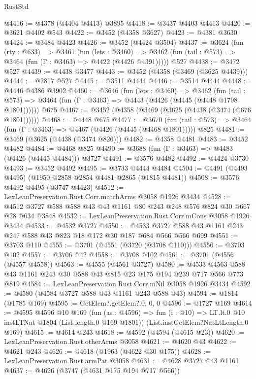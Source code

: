 \begin{lexlean}{RustStd}
\begin{coremodule}
@4416 := @4378 (@4404 @4413) @3895
@4418 := @3437 @4403 @4413
@4420 := @3621 @4402 @543
@4422 := @3452 (@4358 @3627)
@4423 := @4381 @3630
@4424 := @3484 @4423
@4426 := @3452 (@4424 @3504)
@4437 := @3624
    (fun (rty : @633) =>
    @3461
      (fun (lets : @3460) =>
      @3462 (fun (tail : @573) => @3464 (fun (Γ : @3463) => @4422 (@4426 @4391)))))
    @527
@4438 := @3472 @527
@4439 := @4438 @3477
@4443 := @3452 (@4358 (@3469 (@3625 @4439)))
@4444 := @2817 @527
@4445 := @3511 @4444
@4446 := @3514 @4444
@4448 := @4446 @4386 @3902
@4460 := @3646
    (fun (lets : @3460) =>
    @3462
      (fun (tail : @573) => @3464 (fun (Γ : @3463) => @4443 (@4426 (@4445 (@4448 @1798 @1801))))))
    @675
@4467 := @3452 (@4358 (@3469 (@3625 (@4438 (@3474 (@676 @1801))))))
@4468 := @4448 @675
@4477 := @3670
    (fun (tail : @573) => @3464 (fun (Γ : @3463) => @4467 (@4426 (@4445 (@4468 @1801)))))
    @825
@4481 := @3469 (@3625 (@4438 (@3474 @826)))
@4482 := @4358 @4481
@4483 := @3452 @4482
@4484 := @4468 @825
@4490 := @3688 (fun (Γ : @3463) => @4483 (@4426 (@4445 @4484))) @3727
@4491 := @3576 @4482
@4492 := @4424 @3730
@4493 := @3452 @4492
@4495 := @3733 @4444 @4484
@4504 := @4491 (@4493 @4495) (@1950 @2858 @2854 @4481 @2865 (@1815 @4481))
@4508 := @3576 @4492 @4495 (@3747 @4423)
@4512 := LexLeanPreservation.Rust.Corr.matchArms @3058 @1926 @3434
@4528 := @4512 @3727 @588 @588 @43 @43 @1161 @80 @243 @248 @576 @824 @30 @667 @28 @634 @3848
@4532 := LexLeanPreservation.Rust.Corr.mCons @3058 @1926 @3434
@4533 := @4532 @3727
@4550 := @4533 @3727 @588 @43 @1161 @243 @247 @588 @43 @823 @18 @172 @30 @187 @684 @566 @566 @699
@4551 := @3703 @110
@4555 := @3701 (@4551 (@3720 (@3708 @110)))
@4556 := @3703 @102
@4557 := @3706 @42
@4558 := @3708 @102
@4561 := @3701 (@4556 (@4557 @4558))
@4563 := @4555 (@4561 @3727)
@4580 := @4533 @4563 @588 @43 @1161 @243 @30 @588 @43 @815 @23 @175 @194 @239 @717 @566 @773 @819
@4584 := LexLeanPreservation.Rust.Corr.mNil @3058 @1926 @3434
@4592 := @4580 (@4584 @3727 @588 @43 @1161 @243 @588 @43)
@4594 := @1814 (@1785 @169)
@4595 := GetElem?.getElem?.{0, 0, 0}
@4596 := @1727 @169
@4614 := @4595
    @4596
    @10
    @169
    (fun (as : @4596) =>
    fun (i : @10) => LT.lt.{0} @10 instLTNat @1804 (List.length.{0} @169 @1801))
    (List.instGetElem?NatLtLength.{0} @169)
@4615 := @4614 @243
@4618 := @4592 (@4594 (@4615 @23))
@4620 := LexLeanPreservation.Rust.otherArms @3058
@4621 := @4620 @43
@4622 := @4621 @243
@4626 := @4618 (@1963 (@4622 @30 @175))
@4628 := LexLeanPreservation.Rust.armPat @3058
@4631 := @4628 @3727 @43 @1161
@4637 := @4626 (@3747 (@4631 @175 @194 @717 @566))

\end{coremodule}
\end{lexlean}
